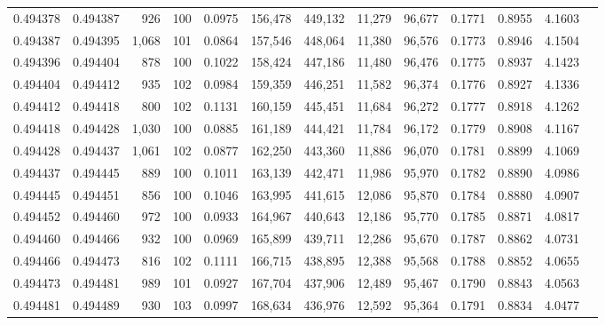 \begin{tabular}{rrrrrrrrrrrrr}
0.494378 & 0.494387 &   926 & 100 &                                     0.0975 & 156,478 & 449,132 &  11,279 &  96,677 & 0.1771 & 0.8955 & 4.1603 \\
0.494387 & 0.494395 & 1,068 & 101 &                                     0.0864 & 157,546 & 448,064 &  11,380 &  96,576 & 0.1773 & 0.8946 & 4.1504 \\
0.494396 & 0.494404 &   878 & 100 &                                     0.1022 & 158,424 & 447,186 &  11,480 &  96,476 & 0.1775 & 0.8937 & 4.1423 \\
0.494404 & 0.494412 &   935 & 102 &                                     0.0984 & 159,359 & 446,251 &  11,582 &  96,374 & 0.1776 & 0.8927 & 4.1336 \\
0.494412 & 0.494418 &   800 & 102 &                                     0.1131 & 160,159 & 445,451 &  11,684 &  96,272 & 0.1777 & 0.8918 & 4.1262 \\
0.494418 & 0.494428 & 1,030 & 100 &                                     0.0885 & 161,189 & 444,421 &  11,784 &  96,172 & 0.1779 & 0.8908 & 4.1167 \\
0.494428 & 0.494437 & 1,061 & 102 &                                     0.0877 & 162,250 & 443,360 &  11,886 &  96,070 & 0.1781 & 0.8899 & 4.1069 \\
0.494437 & 0.494445 &   889 & 100 &                                     0.1011 & 163,139 & 442,471 &  11,986 &  95,970 & 0.1782 & 0.8890 & 4.0986 \\
0.494445 & 0.494451 &   856 & 100 &                                     0.1046 & 163,995 & 441,615 &  12,086 &  95,870 & 0.1784 & 0.8880 & 4.0907 \\
0.494452 & 0.494460 &   972 & 100 &                                     0.0933 & 164,967 & 440,643 &  12,186 &  95,770 & 0.1785 & 0.8871 & 4.0817 \\
0.494460 & 0.494466 &   932 & 100 &                                     0.0969 & 165,899 & 439,711 &  12,286 &  95,670 & 0.1787 & 0.8862 & 4.0731 \\
0.494466 & 0.494473 &   816 & 102 &                                     0.1111 & 166,715 & 438,895 &  12,388 &  95,568 & 0.1788 & 0.8852 & 4.0655 \\
0.494473 & 0.494481 &   989 & 101 &                                     0.0927 & 167,704 & 437,906 &  12,489 &  95,467 & 0.1790 & 0.8843 & 4.0563 \\
0.494481 & 0.494489 &   930 & 103 &                                     0.0997 & 168,634 & 436,976 &  12,592 &  95,364 & 0.1791 & 0.8834 & 4.0477 \\

\end{tabular}
